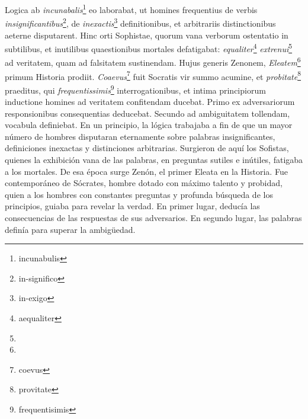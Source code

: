 \documentclass{article}
\begin{document}
\setlength{\columnsep}{2em}
\begin{paracol}{2} 
  Logica ab \emph{incunabalis}\footnote{incunabulis} eo laborabat, ut homines frequentius de verbis \emph{insignificantibus}\footnote{in-significo}, de \emph{inexactis}\footnote{in-exigo} definitionibus, et arbitrariis distinctionibus aeterne disputarent. Hinc orti Sophistae, quorum vana verborum ostentatio in subtilibus, et inutilibus quaestionibus mortales defatigabat: \emph{equaliter}\footnote{aequaliter} \emph{extrenui}\footnote{ } ad veritatem, quam ad falsitatem sustinendam. Hujus generis Zenonem, \emph{Eleatem}\footnote{ } primum Historia prodiit. \emph{Coaevus}\footnote{coevus} fuit Socratis vir summo acumine, et \emph{probitate}\footnote{provitate} praeditus, qui \emph{frequentissimis}\footnote{frequentisimis} interrogationibus, et intima principiorum inductione homines ad veritatem confitendam ducebat. Primo ex adversariorum responsionibus consequentias deducebat. Secundo ad ambiguitatem tollendam, vocabula definiebat.
  \switchcolumn  
  En un principio, la lógica trabajaba a fin de que un mayor número de hombres disputaran eternamente sobre palabras insignificantes, definiciones inexactas y distinciones arbitrarias. Surgieron de aquí los Sofistas, quienes la exhibición vana de las palabras, en preguntas sutiles e inútiles, fatigaba a los mortales. De esa época surge Zenón, el primer Eleata en la Historia. Fue contemporáneo de Sócrates, hombre dotado con máximo talento y probidad, quien a los hombres con constantes preguntas y profunda búsqueda de los principios, guiaba para revelar la verdad. En primer lugar, deducía las consecuencias de las respuestas de sus adversarios. En segundo lugar, las palabras definía para superar la ambigüedad.
\end{paracol}

\vspace{0.5cm}

\end{document}
